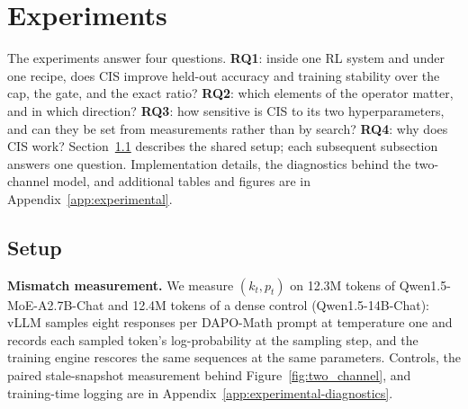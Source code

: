 \section{Experiments}
\label{sec:experiments}

The experiments answer four questions. \textbf{RQ1}: inside one RL system and under one recipe, does CIS improve held-out accuracy and training stability over the cap, the gate, and the exact ratio? \textbf{RQ2}: which elements of the operator matter, and in which direction? \textbf{RQ3}: how sensitive is CIS to its two hyperparameters, and can they be set from measurements rather than by search? \textbf{RQ4}: why does CIS work? Section~\ref{sec:experiments-setup} describes the shared setup; each subsequent subsection answers one question. Implementation details, the diagnostics behind the two-channel model, and additional tables and figures are in Appendix~\ref{app:experimental}.

\subsection{Setup}
\label{sec:experiments-setup}

\noindent\textbf{Mismatch measurement.}\label{sec:exp_measurement}
We measure $(k_t,p_t)$ on 12.3M tokens of Qwen1.5-MoE-A2.7B-Chat and 12.4M tokens of a dense control (Qwen1.5-14B-Chat): vLLM samples eight responses per DAPO-Math prompt at temperature one and records each sampled token's log-probability at the sampling step, and the training engine rescores the same sequences at the same parameters. Controls, the paired stale-snapshot measurement behind Figure~\ref{fig:two_channel}, and training-time logging are in Appendix~\ref{app:experimental-diagnostics}.

